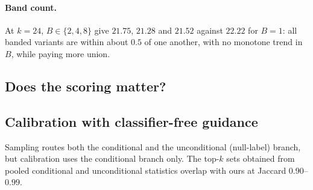 \paragraph{Band count.}
At $k=24$, $B\in\{2,4,8\}$ give $21.75$, $21.28$ and $21.52$ against $22.22$ for $B=1$: all banded variants are within about $0.5$ of one another, with no monotone trend in $B$, while paying more union. 

\subsection{Does the scoring matter?}\label{sec:scoring}

\subsection{Calibration with classifier-free guidance}\label{sec:cfg}
Sampling routes both the conditional and the unconditional (null-label) branch, but calibration uses the conditional branch only. The top-$k$ sets obtained from pooled conditional and unconditional statistics overlap with ours at Jaccard $0.90$--$0.99$. 
